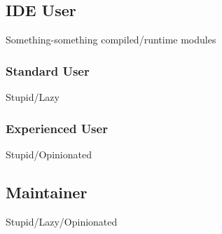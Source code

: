 \subsection{IDE User}

Something-something compiled/runtime modules

\subsubsection{Standard User}

Stupid/Lazy

\subsubsection{Experienced User}

Stupid/Opinionated

\subsection{Maintainer}

Stupid/Lazy/Opinionated
